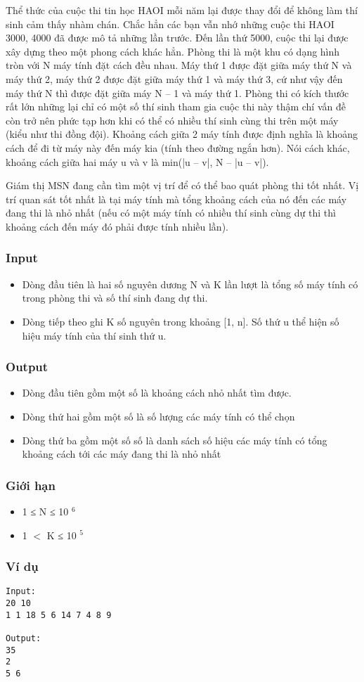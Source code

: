 



   Thể thức của cuộc thi tin học HAOI mỗi năm lại được thay đổi để không làm thí sinh cảm thấy nhàm chán. Chắc hẳn các bạn vẫn nhớ những cuộc thi HAOI 3000, 4000 đã được mô tả những lần trước. Đến lần thứ 5000, cuộc thi lại được xây dựng theo một phong cách khác hẳn. Phòng thi là một khu có dạng hình tròn với N máy tính đặt cách đều nhau. Máy thứ 1 được đặt giữa máy thứ N và máy thứ 2, máy thứ 2 được đặt giữa máy thứ 1 và máy thứ 3, cứ như vậy đến máy thứ N thì được đặt giữa máy N – 1 và máy thứ 1. Phòng thi có kích thước rất lớn những lại chỉ có một số thí sinh tham gia cuộc thi này thậm chí vấn đề còn trở nên phức tạp hơn khi có thể có nhiều thí sinh cùng thi trên một máy (kiểu như thi đồng đội). Khoảng cách giữa 2 máy tính được định nghĩa là khoảng cách để đi từ máy này đến máy kia (tính theo đường ngắn hơn). Nói cách khác, khoảng cách giữa hai máy u và v là min(|u – v|, N – |u – v|).  

   Giám thị MSN đang cần tìm một vị trí để có thể bao quát phòng thi tốt nhất. Vị trí quan sát tốt nhất là tại máy tính mà tổng khoảng cách của nó đến các máy đang thi là nhỏ nhất (nếu có một máy tính có nhiều thí sinh cùng dự thi thì khoảng cách đến máy đó phải được tính nhiều lần).  

\subsubsection{   Input  }
\begin{itemize}
	\item     Dòng đầu tiên là hai số nguyên dương N và K lần lượt là tổng số máy tính có trong phòng thi và số thí sinh đang dự thi.   
	\item     Dòng tiếp theo ghi K số nguyên trong khoảng [1, n]. Số thứ u thể hiện số hiệu máy tính của thí sinh thứ u.   
\end{itemize}

\subsubsection{   Output  }
\begin{itemize}
	\item     Dòng đầu tiên gồm một số là khoảng cách nhỏ nhất tìm được.   
	\item     Dòng thứ hai gồm một số là số lượng các máy tính có thể chọn   
	\item     Dòng thứ ba gồm một số số là danh sách số hiệu các máy tính có tổng khoảng cách tới các máy đang thi là nhỏ nhất   
\end{itemize}

\subsubsection{   Giới hạn  }
\begin{itemize}
	\item     1 ≤ N ≤ 10    $^     6    $
	\item     1 $<$ K ≤ 10    $^     5    $
\end{itemize}

\subsubsection{   Ví dụ  }
\begin{verbatim}
Input:
20 10
1 1 18 5 6 14 7 4 8 9

Output:
35
2
5 6
\end{verbatim}